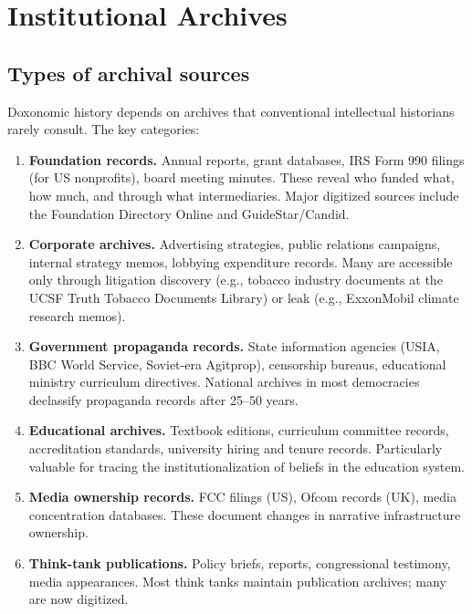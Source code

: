 \section{Institutional Archives}
\label{sec:ch18-archives}

\subsection{Types of archival sources}

Doxonomic history depends on archives that conventional intellectual historians rarely consult.
The key categories:

\begin{enumerate}
  \item \textbf{Foundation records.}
  Annual reports, grant databases, IRS Form 990 filings (for US nonprofits), board meeting minutes.
  These reveal who funded what, how much, and through what intermediaries.
  Major digitized sources include the Foundation Directory Online and GuideStar/Candid.

  \item \textbf{Corporate archives.}
  Advertising strategies, public relations campaigns, internal strategy memos, lobbying expenditure records.
  Many are accessible only through litigation discovery (e.g., tobacco industry documents at the UCSF Truth Tobacco Documents Library) or leak (e.g., ExxonMobil climate research memos).

  \item \textbf{Government propaganda records.}
  State information agencies (USIA, BBC World Service, Soviet-era Agitprop), censorship bureaus, educational ministry curriculum directives.
  National archives in most democracies declassify propaganda records after 25--50 years.

  \item \textbf{Educational archives.}
  Textbook editions, curriculum committee records, accreditation standards, university hiring and tenure records.
  Particularly valuable for tracing the institutionalization of beliefs in the education system.

  \item \textbf{Media ownership records.}
  FCC filings (US), Ofcom records (UK), media concentration databases.
  These document changes in narrative infrastructure ownership.

  \item \textbf{Think-tank publications.}
  Policy briefs, reports, congressional testimony, media appearances.
  Most think tanks maintain publication archives; many are now digitized.
\end{enumerate}

